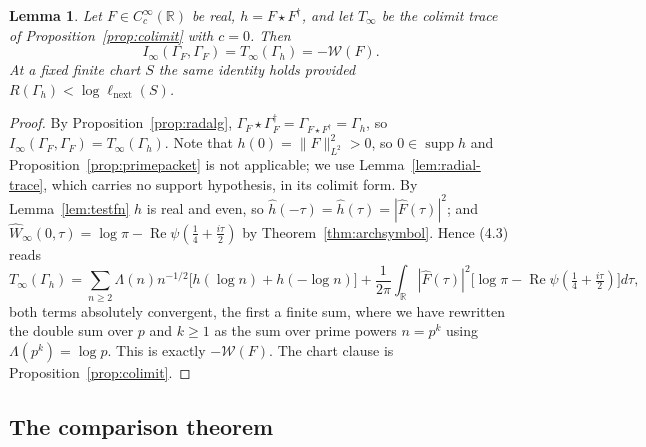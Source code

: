 \documentclass[11pt]{amsart}
\newtheorem{lemma}[theorem]{Lemma}
\theoremstyle{definition}
\theoremstyle{remark}
\newcommand{\R}{\mathbb R}
\newcommand{\Rel}{\operatorname{Re}}
\newcommand{\supp}{\operatorname{supp}}
\begin{document}
\begin{lemma}
\label{lem:traceweil}
Let $F\in C_c^\infty(\R)$ be real, $h=F\star F^\dagger$, and let $T_\infty$ be
the colimit trace of Proposition~\emph{\ref{prop:colimit}} with $c=0$.  Then
\begin{equation}
  I_\infty(\Gamma_F,\Gamma_F)=T_\infty(\Gamma_h)=-\mathcal W(F).
\tag{9.3}
\end{equation}
At a fixed finite chart $S$ the same identity holds provided
$R(\Gamma_h)<\log\ell_{\mathrm{next}}(S)$.
\end{lemma}

\begin{proof}
By Proposition~\ref{prop:radalg},
$\Gamma_F\star\Gamma_F^\dagger=\Gamma_{F\star F^\dagger}=\Gamma_h$, so
$I_\infty(\Gamma_F,\Gamma_F)=T_\infty(\Gamma_h)$.  Note that $h(0)=\|F\|_{L^2}^2>0$,
so $0\in\supp h$ and Proposition~\ref{prop:primepacket} is not applicable; we
use Lemma~\ref{lem:radial-trace}, which carries no support hypothesis, in its
colimit form.  By Lemma~\ref{lem:testfn} $h$ is real and even, so
$\hat h(-\tau)=\hat h(\tau)=|\hat F(\tau)|^2$; and
$\widehat W_\infty(0,\tau)=\log\pi-\Rel\psi(\tfrac14+\tfrac{i\tau}2)$ by
Theorem~\ref{thm:archsymbol}.  Hence (4.3) reads
\[
  T_\infty(\Gamma_h)=\sum_{n\ge2}\Lambda(n)n^{-1/2}
     \bigl[h(\log n)+h(-\log n)\bigr]
   +\frac1{2\pi}\int_\R|\hat F(\tau)|^2
     \bigl[\log\pi-\Rel\psi(\tfrac14+\tfrac{i\tau}2)\bigr]d\tau ,
\]
both terms absolutely convergent, the first a finite sum, where we have
rewritten the double sum over $p$ and $k\ge1$ as the sum over prime powers
$n=p^k$ using $\Lambda(p^k)=\log p$.  This is exactly $-\mathcal W(F)$.  The
chart clause is Proposition~\ref{prop:colimit}.
\end{proof}

\subsection{The comparison theorem}
\end{document}
